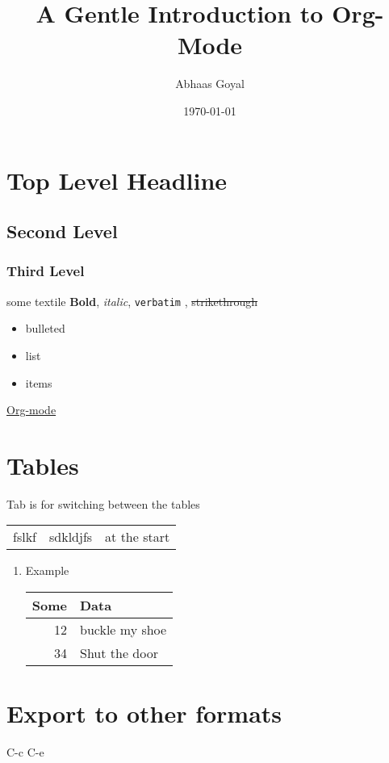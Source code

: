 \documentclass[11pt]{article}
\author{Abhaas Goyal}
\date{\today}
\title{A Gentle Introduction to Org-Mode}
\begin{document}
\maketitle
\section{Top Level Headline}
\label{sec:org4b64a0e}
\subsection{Second Level}
\label{sec:org03c58b3}
\subsubsection{Third Level}
\label{sec:orgeb61988}
some textile
\textbf{Bold}, \emph{italic}, \texttt{verbatim} , \sout{strikethrough}
\begin{itemize}
\item bulleted
\item list
\item items
\end{itemize}

\href{http://orgmode.org/}{Org-mode}

\section{Tables}
\label{sec:orgdcb7650}
Tab is for switching between the tables
\begin{center}
\begin{tabular}{lll}
\hline
fslkf & sdkldjfs & at the start\\
\end{tabular}
\end{center}
\begin{enumerate}
\item Example
\label{sec:org9481d18}
\begin{center}
\begin{tabular}{rl}
Some & Data\\
\hline
12 & buckle my shoe\\
34 & Shut the door\\
\end{tabular}
\end{center}
\end{enumerate}

\section{Export to other formats}
\label{sec:org9d2f8aa}
C-c C-e
\end{document}
